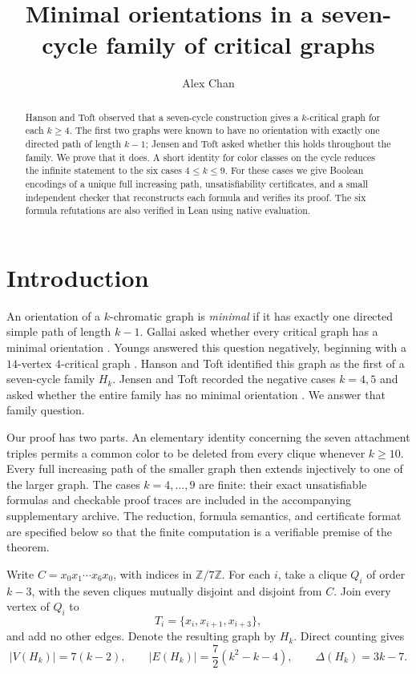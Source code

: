 \documentclass[11pt]{amsart}
\title[Minimal orientations in a seven-cycle family]
 {Minimal orientations in a seven-cycle family of critical graphs}
\author{Alex Chan}
\date{}
\newcommand{\Z}{\mathbb Z}
\begin{document}
\begin{abstract}
Hanson and Toft observed that a seven-cycle construction gives a
$k$-critical graph for each $k\geq4$.  The first two graphs were known
to have no orientation with exactly one directed path of length $k-1$;
Jensen and Toft asked whether this holds throughout the family.  We
prove that it does.  A short identity for color classes on the cycle
reduces the infinite statement to the six cases $4\leq k\leq9$.  For
these cases we give Boolean encodings of a unique full increasing path,
unsatisfiability certificates, and a small independent checker that
reconstructs each formula and verifies its proof.  The six formula
refutations are also verified in Lean using native evaluation.
\end{abstract}
\maketitle

\section{Introduction}

An orientation of a $k$-chromatic graph is \emph{minimal} if it has
exactly one directed simple path of length $k-1$.  Gallai asked whether
every critical graph has a minimal orientation \cite{Gallai}.  Youngs answered this
question negatively, beginning with a $14$-vertex $4$-critical graph
\cite{Youngs}.  Hanson and Toft identified this graph as the first of a
seven-cycle family $H_k$.  Jensen and Toft recorded the negative cases
$k=4,5$ and asked whether the entire family has no minimal orientation
\cite[\S13.8, pp.~215--216]{JT}.  We answer that family question.

Our proof has two parts.  An elementary identity concerning the seven
attachment triples permits a common color to be deleted from every
clique whenever $k\geq10$.  Every full increasing path of the smaller
graph then extends injectively to one of the larger graph.  The cases
$k=4,\ldots,9$ are finite: their exact unsatisfiable formulas and
checkable proof traces are included in the accompanying supplementary
archive.  The reduction, formula semantics, and certificate format are
specified below so that the finite computation is a verifiable premise
of the theorem.

Write $C=x_0x_1\cdots x_6x_0$, with indices in $\Z/7\Z$.  For each
$i$, take a clique $Q_i$ of order $k-3$, with the seven cliques mutually
disjoint and disjoint from $C$.  Join every vertex of $Q_i$ to
\begin{equation}\label{eq:triples}
 T_i=\{x_i,x_{i+1},x_{i+3}\},
\end{equation}
and add no other edges.  Denote the resulting graph by $H_k$.  Direct
counting gives
\begin{equation}\label{eq:parameters}
 |V(H_k)|=7(k-2),\qquad
 |E(H_k)|=\frac{7}{2}(k^2-k-4),\qquad
 \Delta(H_k)=3k-7.
\end{equation}
\end{document}
